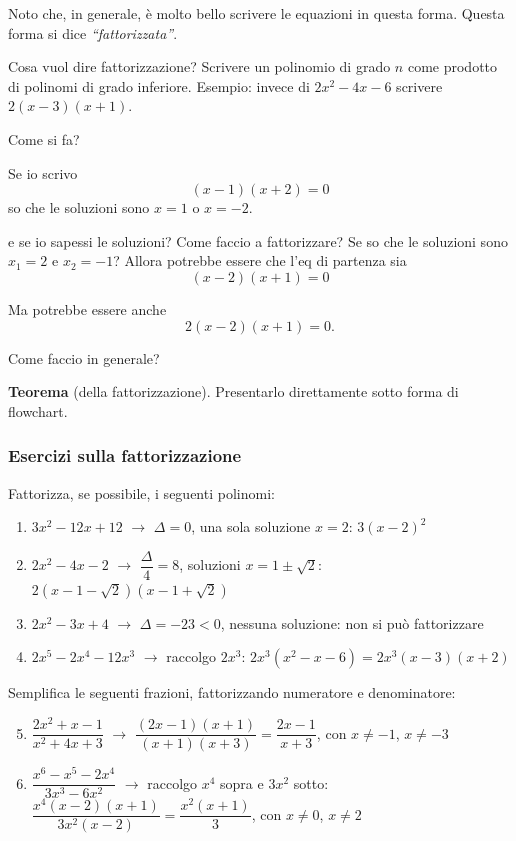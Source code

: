 \documentclass[11pt]{report}
\begin{document}
Noto che, in generale, è molto bello scrivere le equazioni in questa forma. Questa forma si dice \textit{“fattorizzata”}.

Cosa vuol dire fattorizzazione? Scrivere un polinomio di grado $n$ come prodotto di polinomi di grado inferiore. Esempio: invece di $2x^2-4x-6$ scrivere $2(x-3)(x+1).$


Come si fa?

Se io scrivo
$$
(x-1)(x+2)=0
$$
so che le soluzioni sono $x=1$ o $x=-2$. 

e se io sapessi le soluzioni? Come faccio a fattorizzare? Se so che le soluzioni sono $x_1 = 2$ e $x_2=-1$? Allora potrebbe essere che l'eq di partenza sia 
$$
(x-2)(x+1)=0
$$

Ma potrebbe essere anche 
$$
2(x-2)(x+1)=0.
$$

Come faccio in generale?

\begin{mdframed}
    \textbf{Teorema} (della fattorizzazione).
    Presentarlo direttamente sotto forma di flowchart.
\end{mdframed}

\subsubsection{Esercizi sulla fattorizzazione}

Fattorizza, se possibile, i seguenti polinomi:
\begin{enumerate}
    \item $3x^2-12x+12$ $\rightarrow$ $\Delta=0$, una sola soluzione $x=2$: \quad $3(x-2)^2$
    \item $2x^2-4x-2$ $\rightarrow$ $\dfrac\Delta4=8$, soluzioni $x=1\pm\sqrt2$: \quad $2\left(x-1-\sqrt2\right)\left(x-1+\sqrt2\right)$
    \item $2x^2-3x+4$ $\rightarrow$ $\Delta=-23<0$, nessuna soluzione: non si può fattorizzare
    \item $2x^5-2x^4-12x^3$ $\rightarrow$ raccolgo $2x^3$: \quad $2x^3\left(x^2-x-6\right)=2x^3(x-3)(x+2)$
\end{enumerate}

Semplifica le seguenti frazioni, fattorizzando numeratore e denominatore:
\begin{enumerate}
    \setcounter{enumi}{4}
    \item $\dfrac{2x^2+x-1}{x^2+4x+3}$ $\rightarrow$ $\dfrac{(2x-1)(x+1)}{(x+1)(x+3)}=\dfrac{2x-1}{x+3}$, \quad con $x\neq-1$, $x\neq-3$
    \item $\dfrac{x^6-x^5-2x^4}{3x^3-6x^2}$ $\rightarrow$ raccolgo $x^4$ sopra e $3x^2$ sotto: \quad $\dfrac{x^4(x-2)(x+1)}{3x^2(x-2)}=\dfrac{x^2(x+1)}{3}$, \quad con $x\neq0$, $x\neq2$
\end{enumerate}
\end{document}
